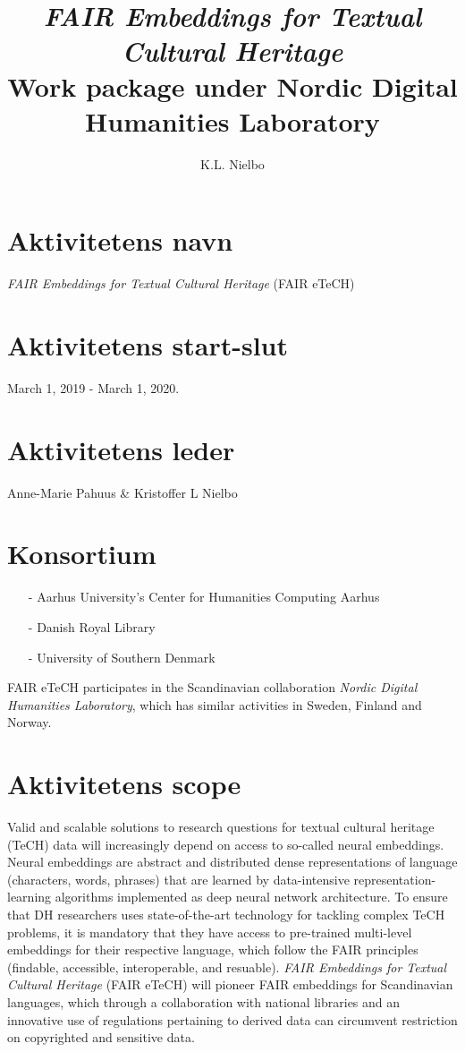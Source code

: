 \documentclass[12pt,a4paper]{article}
\title{\emph{FAIR Embeddings for Textual Cultural Heritage}\\Work package under Nordic Digital Humanities Laboratory}%
\author{K.L. Nielbo}
\begin{document}
\section*{Aktivitetens navn}
\emph{FAIR Embeddings for Textual Cultural Heritage} (FAIR eTeCH)

\section*{Aktivitetens start-slut}
March 1, 2019 - March 1, 2020.
\section*{Aktivitetens leder}
Anne-Marie Pahuus \& Kristoffer L Nielbo
\section*{Konsortium}
\begin{itemize}
	\item[-] Aarhus University's Center for Humanities Computing Aarhus
	\item[-] Danish Royal Library
	\item[-] University of Southern Denmark
\end{itemize}

FAIR eTeCH participates in the Scandinavian collaboration \emph{Nordic Digital Humanities Laboratory}, which has similar activities in Sweden, Finland and Norway.

\section*{Aktivitetens scope}
Valid and scalable solutions to research questions for textual cultural heritage (TeCH) data will increasingly depend on access to so-called neural embeddings. Neural embeddings are abstract and distributed dense representations of language (characters, words, phrases) that are learned by data-intensive representation-learning algorithms implemented as deep neural network architecture. To ensure that DH researchers uses state-of-the-art technology for tackling complex TeCH problems, it is mandatory that they have access to pre-trained multi-level embeddings for their respective language, which follow the FAIR principles (findable, accessible, interoperable, and resuable). \emph{FAIR Embeddings for Textual Cultural Heritage} (FAIR eTeCH) will pioneer FAIR embeddings for Scandinavian languages, which through a collaboration with national libraries and an innovative use of regulations pertaining to derived data can circumvent restriction on copyrighted and sensitive data.
\end{document}
